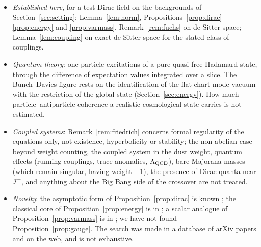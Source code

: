 \documentclass[11pt,a4paper]{article}
\theoremstyle{definition}
\newcommand{\scri}{\mathscr{I}^{+}}
\begin{document}
\begin{itemize}[leftmargin=1.5em]
\item \emph{Established here}, for a test Dirac field on the backgrounds of Section~\ref{sec:setting}: Lemma~\ref{lem:norm}, Propositions~\ref{prop:dirac}--\ref{prop:energy} and \ref{prop:varmass}, Remark~\ref{rem:fuchs} on de Sitter space; Lemma~\ref{lem:coupling} on exact de Sitter space for the stated class of couplings.
\item \emph{Quantum theory}: one-particle excitations of a pure quasi-free Hadamard state, through the difference of expectation values integrated over a slice. The Bunch--Davies figure rests on the identification of the flat-chart mode vacuum with the restriction of the global state (Section~\ref{sec:energy}). How much particle--antiparticle coherence a realistic cosmological state carries is not estimated.
\item \emph{Coupled systems}: Remark~\ref{rem:friedrich} concerns formal regularity of the equations only, not existence, hyperbolicity or stability; the non-abelian case beyond weight counting, the coupled system in the dust weight, quantum effects (running couplings, trace anomalies, $\Lambda_{\rm QCD}$), bare Majorana masses (which remain singular, having weight $-1$), the presence of Dirac quanta near $\scri$, and anything about the Big Bang side of the crossover are not treated.
\item \emph{Novelty}: the asymptotic form of Proposition~\ref{prop:dirac} is known \cite{DFMR2019,Ibison2011}; the classical core of Proposition~\ref{prop:energy} is in \cite{Ibison2011}; a scalar analogue of Proposition~\ref{prop:varmass} is in \cite{Bachelot2020}; we have not found Proposition~\ref{prop:gauge}. The search was made in a database of arXiv papers and on the web, and is not exhaustive.
\end{itemize}
\end{document}
